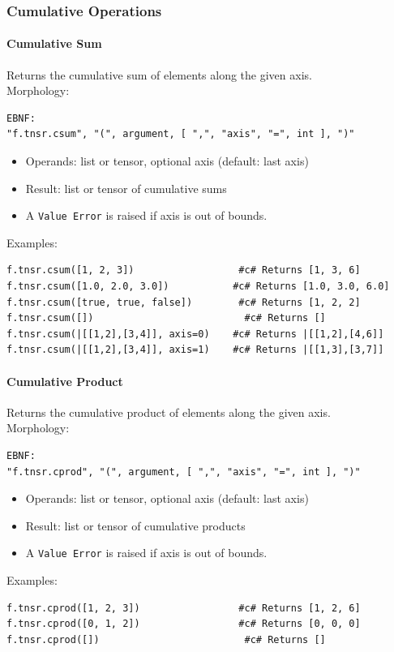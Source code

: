 \subsubsection{Cumulative Operations}

\paragraph{Cumulative Sum}
Returns the cumulative sum of elements along the given axis.\\
Morphology:
\begin{verbatim}
EBNF:
"f.tnsr.csum", "(", argument, [ ",", "axis", "=", int ], ")"
\end{verbatim}
\begin{itemize}
\item Operands: list or tensor, optional axis (default: last axis)
\item Result: list or tensor of cumulative sums
\item A \texttt{Value Error} is raised if axis is out of bounds.
\end{itemize}
Examples:
\begin{verbatim}
f.tnsr.csum([1, 2, 3])                  #c# Returns [1, 3, 6]
f.tnsr.csum([1.0, 2.0, 3.0])           #c# Returns [1.0, 3.0, 6.0]
f.tnsr.csum([true, true, false])        #c# Returns [1, 2, 2]
f.tnsr.csum([])                          #c# Returns []
f.tnsr.csum(|[[1,2],[3,4]], axis=0)    #c# Returns |[[1,2],[4,6]]
f.tnsr.csum(|[[1,2],[3,4]], axis=1)    #c# Returns |[[1,3],[3,7]]
\end{verbatim}

\paragraph{Cumulative Product}
Returns the cumulative product of elements along the given axis.\\
Morphology:
\begin{verbatim}
EBNF:
"f.tnsr.cprod", "(", argument, [ ",", "axis", "=", int ], ")"
\end{verbatim}
\begin{itemize}
\item Operands: list or tensor, optional axis (default: last axis)
\item Result: list or tensor of cumulative products
\item A \texttt{Value Error} is raised if axis is out of bounds.
\end{itemize}
Examples:
\begin{verbatim}
f.tnsr.cprod([1, 2, 3])                 #c# Returns [1, 2, 6]
f.tnsr.cprod([0, 1, 2])                 #c# Returns [0, 0, 0]
f.tnsr.cprod([])                         #c# Returns []
\end{verbatim}

